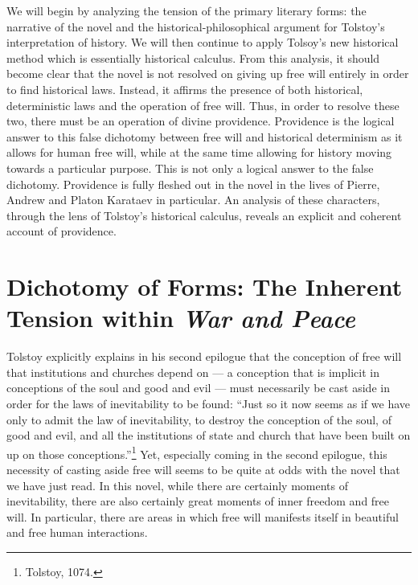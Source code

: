 \documentclass[12pt]{article}
\begin{document}
We will begin by analyzing the tension of the primary literary forms: the narrative of the novel and the historical-philosophical argument for Tolstoy's interpretation of history. We will then continue to apply Tolsoy's new historical method which is essentially historical calculus. From this analysis, it should become clear that the novel is not resolved on giving up free will entirely in order to find historical laws. Instead, it affirms the presence of both historical, deterministic laws and the operation of free will. Thus, in order to resolve these two, there must be an operation of divine providence. Providence is the logical answer to this false dichotomy between free will and historical determinism as it allows for human free will, while at the same time allowing for history moving towards a particular purpose. This is not only a logical answer to the false dichotomy. Providence is fully fleshed out in the novel in the lives of Pierre, Andrew and Platon Karataev in particular. An analysis of these characters, through the lens of Tolstoy's historical calculus, reveals an explicit and coherent account of providence.

\section{Dichotomy of Forms: The Inherent Tension within \emph{War and Peace}} 
Tolstoy explicitly explains in his second epilogue that the conception of free will that institutions and churches depend on --- a conception that is implicit in conceptions of the soul and good and evil --- must necessarily be cast aside in order for the laws of inevitability to be found: ``Just so it now seems as if we have only to admit the law of inevitability, to destroy the conception of the soul, of good and evil, and all the institutions of state and church that have been built on up on those conceptions.''\footnote{Tolstoy, 1074.} Yet, especially coming in the second epilogue, this necessity of casting aside free will seems to be quite at odds with the novel that we have just read. In this novel, while there are certainly moments of inevitability, there are also certainly great moments of inner freedom and free will. In particular, there are areas in which free will manifests itself in beautiful and free human interactions.
 
\end{document}
